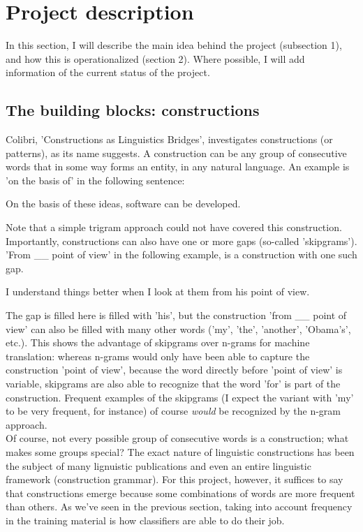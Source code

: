 \documentclass[12pt]{article}
\begin{document}
\section{Project description}

In this section, I will describe the main idea behind the project (subsection 1), and how this is operationalized (section 2). Where possible, I will add information of the current status of the project.

\subsection{The building blocks: constructions}

Colibri, 'Constructions as Linguistics Bridges', investigates constructions (or patterns), as its name suggests. A construction can be any group of consecutive words  that in some way forms an entity, in any natural language. An example is 'on the basis of' in the following sentence:

\begin{examples}
\item On the basis of these ideas, software can be developed.
\end{examples}

Note that a simple trigram approach could not have covered this construction. Importantly, constructions can also have one or more gaps (so-called 'skipgrams'). 'From \_\_ point of view' in the following example, is a construction with one such gap. 

\begin{examples}
\item I understand things better when I look at them from his point of view.
\end{examples}

The gap is filled here is filled with 'his', but the construction 'from \_\_ point of view' can also be filled with many other words ('my', 'the', 'another', 'Obama's', etc.). This shows the advantage of skipgrams over n-grams for machine translation: whereas n-grams would only have been able to capture the construction 'point of view', because the word directly before 'point of view' is variable, skipgrams are also able to recognize that the word 'for' is part of the construction. Frequent examples of the skipgrams (I expect the variant with 'my' to be very frequent, for instance) of course \emph{would} be recognized by the n-gram approach.\\\indent
Of course, not every possible group of consecutive words is a construction; what makes some groups special? The exact nature of linguistic constructions has been the subject of many lignuistic publications and even an entire linguistic framework (construction grammar). For this project, however, it suffices to say that constructions emerge because some combinations of words are more frequent than others. As we've seen in the previous section, taking into account frequency in the training material is how classifiers are able to do their job.
\end{document}
